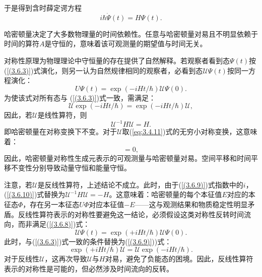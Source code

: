于是得到含时薛定谔方程
\begin{equation}
	i\hbar\dot{\Psi}(t)=H\Psi(t). 
\end{equation}

哈密顿量决定了大多数物理量的时间依赖性。任意与哈密顿量对易且不明显依赖于时间的算符$A$是守恒的，意味着该可观测量的期望值与时间无关。

对称性原理为物理理论中守恒量的存在提供了自然解释。若观察者看到态$\Psi(t)$按\newline
(\ref{(3.6.3)})式演化，则另一认为自然规律相同的观察者，必看到态$\mathscr{U}\Psi(t)$按同一方程演化：
\begin{equation}
	U\Psi(t)=\exp(-iHt/\hbar)\mathscr{U}\Psi(0). \label{(3.6.8)}
\end{equation}
为使该式对所有态与 (\ref{(3.6.3)})式一致，需满足：
\begin{equation}
	\mathscr{U}\exp(-iHt/\hbar)=\exp(-iHt/\hbar)\mathscr{U},\label{(3.6.9)}
\end{equation}
因此，若$\mathscr{U}$是线性算符，则
\begin{equation}
	\mathscr{U}^{-1}H\mathscr{U}=H. \label{(3.6.10)}
\end{equation}
即哈密顿量在对称变换下不变。对于$\mathscr{U}$取(\ref{eq:3.4.11})式的无穷小对称变换，这意味着：
\begin{equation}
	[H, T]=0,
\end{equation}
因此，哈密顿量对称性生成元表示的可观测量与哈密顿量对易。空间平移和时间平移不变性分别导致动量守恒和能量守恒。

注意，若$\mathscr{U}$是反线性算符，上述结论不成立。此时，由于(\ref{(3.6.9)})式指数中的$i$，(\ref{(3.6.10)})式替换为$\mathscr{U}^{-1}H\mathscr{U}=-H$。这意味着：哈密顿量的每个本征值$E$对应的本征态$\Phi$，存在另一本征态$U\Phi$对应本征值$-E$——这与观测结果和物质稳定性明显矛盾。反线性算符表示的对称性要避免这一结论，必须假设这类对称性反转时间流向，而非满足(\ref{(3.6.8)})式：
\begin{equation}
	\mathscr{U}\Psi(t)=\exp(+iHt/\hbar)\mathscr{U}\Psi(0). \label{(3.6.12)}
\end{equation}
此时，与(\ref{(3.6.3)})式一致的条件替换为(\ref{(3.6.9)}))式：
\begin{equation}
	\exp(+iHt/\hbar)\mathscr{U}=\mathscr{U}\exp(-iHt/\hbar). \label{(3.6.13)}
\end{equation}
对于反线性$\mathscr{U}$，这再次导致$\mathscr{U}$与$H$对易，避免了负能态的困境。因此，反线性算符表示的对称性是可能的，但必然涉及时间流向的反转。